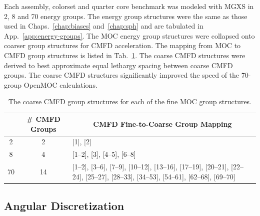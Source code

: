Each assembly, colorset and quarter core benchmark was modeled with \ac{MGXS} in 2, 8 and 70 energy groups. The energy group structures were the same as those used in Chaps.~\ref{chap:biases} and~\ref{chap:sph} and are tabulated in App.~\ref{app:energy-groups}. The \ac{MOC} energy group structures were collapsed onto coarser group structures for \ac{CMFD} acceleration. The mapping from \ac{MOC} to \ac{CMFD} group structures is listed in Tab.~\ref{table:chap8-coarse-cmfd-groups}. The coarse \ac{CMFD} structures were derived to best approximate equal lethargy spacing between coarse \ac{CMFD} groups. The coarse \ac{CMFD} structures significantly improved the speed of the 70-group OpenMOC calculations.

\begin{table}[h!]
  \centering
  \caption[Coarse \ac{CMFD} group structures]{The coarse \ac{CMFD} group structures for each of the fine \ac{MOC} group structures.}
  \small
  \label{table:chap8-coarse-cmfd-groups}
  \vspace{6pt}
  \begin{tabular}{p{1.5cm} p{1.5cm} p{7.2cm}}
  \toprule
  \rowcolor{lightgray}
  \multicolumn{1}{c}{\cellcolor{lightgray} \textbf{\# \ac{MOC} Groups}} &
  \multicolumn{1}{c}{\cellcolor{lightgray} \textbf{\# \ac{CMFD} Groups}} &
  \multicolumn{1}{c}{\cellcolor{lightgray} \textbf{\ac{CMFD} Fine-to-Coarse Group Mapping}} \\
  \midrule
  \multicolumn{1}{c}{2} & \multicolumn{1}{c}{2} & [1], [2] \\
  \midrule
  \multicolumn{1}{c}{8} & \multicolumn{1}{c}{4} & [1--2], [3], [4--5], [6--8] \\
  \midrule
  \multicolumn{1}{c}{70} & \multicolumn{1}{c}{14} & [1--2], [3--6], [7--9], [10--12], [13--16], \hspace{0.6cm} [17--19], [20--21], [22--24], [25--27], [28--33], [34--53], [54--61], [62--68], [69--70] \\ 
  \bottomrule
\end{tabular}
\end{table}

\subsection{Angular Discretization}
\label{subsec:chap8-angular-discretizations}

